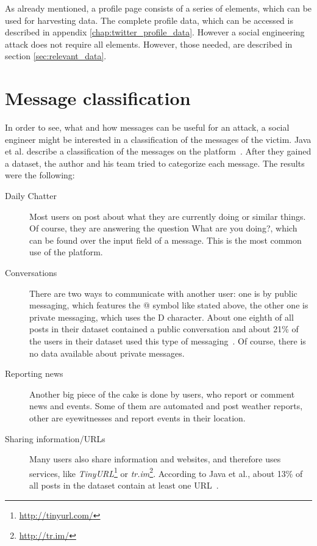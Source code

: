 As already mentioned, a \Twitter{} profile page consists of a series of
elements, which can be used for harvesting data. The complete profile data,
which can be accessed is described in appendix \ref{chap:twitter_profile_data}.
However a social engineering attack does not require all elements. However,
those needed, are described in section \ref{sec:relevant_data}.

\section{Message classification}

In order to see, what and how messages can be useful for an attack, a social
engineer might be interested in a classification of the messages of the victim.
Java et al. describe a classification of the messages on the \Twitter{}
platform~\cite{java2007}. After they gained a dataset, the author and his team
tried to categorize each message. The results were the following:

\begin{description}

\item[Daily Chatter]
Most users on \Twitter{} post about what they are currently doing or similar
things. Of course, they are answering the question \glqq{}What are you
doing?\grqq{}, which can be found over the input field of a message. This is
the most common use of the \Twitter{} platform.

\item[Conversations]
There are two ways to communicate with another user: one is by public
messaging, which features the @ symbol like stated above, the other one is
private messaging, which uses the D character. About one eighth of all posts
in their dataset contained a public conversation and about 21\% of the users in
their dataset used this type of messaging~\cite{java2007}. Of course, there is
no data available about private messages.

\item[Reporting news]
Another big piece of the cake is done by users, who report or comment news and
events. Some of them are automated and post weather reports, other are
eyewitnesses and report events in their location.

\item[Sharing information/URLs]
Many users also share information and websites, and therefore uses services,
like \textit{TinyURL}\footnote{\url{http://tinyurl.com/}} or
\textit{tr.im}\footnote{\url{http://tr.im/}}. According to Java et al.,
about 13\% of all posts in the dataset contain at least one URL~\cite{java2007}.

\end{description}


